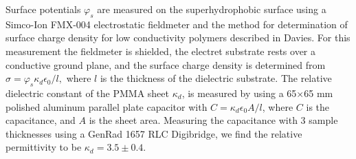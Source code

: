 \documentclass[aip,reprint, floatfix]{revtex4-1}
\begin{document}
Surface potentials $\varphi_s$ are measured on the superhydrophobic surface using a Simco-Ion FMX-004 electrostatic fieldmeter and the method for determination of surface charge density for low conductivity polymers described in Davies. \cite{davies_examination_1967} For this measurement the fieldmeter is shielded, the electret substrate rests over a conductive ground plane, and the surface charge density is determined from $\sigma = \varphi_s \kappa_d \epsilon_0/l,$ where $l$ is the thickness of the dielectric substrate. The relative dielectric constant of the PMMA sheet $\kappa_d$, is measured by using a 65$\times$65 mm polished aluminum parallel plate capacitor with $C = \kappa_d \epsilon_0 A/l$, where $C$ is the capacitance, and $A$ is the sheet area. Measuring the capacitance with 3 sample thicknesses using a GenRad 1657 RLC Digibridge, we find the relative permittivity to be $\kappa_d = 3.5 \pm 0.4$.  
\end{document}
